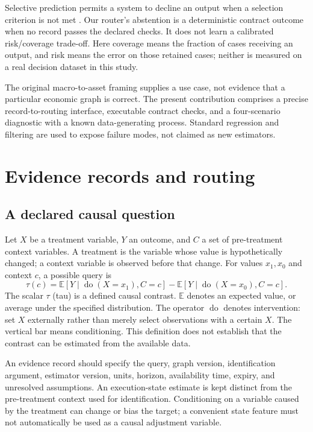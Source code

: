 Selective prediction permits a system to decline an output when a selection criterion is not met \citep{geifman2019selectivenet}. Our router's abstention is a deterministic contract outcome when no record passes the declared checks. It does not learn a calibrated risk/coverage trade-off. Here coverage means the fraction of cases receiving an output, and risk means the error on those retained cases; neither is measured on a real decision dataset in this study.

The original macro-to-asset framing supplies a use case, not evidence that a particular economic graph is correct. The present contribution comprises a precise record-to-routing interface, executable contract checks, and a four-scenario diagnostic with a known data-generating process. Standard regression and filtering are used to expose failure modes, not claimed as new estimators.

\section{Evidence records and routing}
\subsection{A declared causal question}
Let $X$ be a treatment variable, $Y$ an outcome, and $C$ a set of pre-treatment context variables. A treatment is the variable whose value is hypothetically changed; a context variable is observed before that change. For values $x_1,x_0$ and context $c$, a possible query is
\begin{equation}
 \tau(c)=\mathbb{E}[Y\mid\operatorname{do}(X=x_1),C=c]
 -\mathbb{E}[Y\mid\operatorname{do}(X=x_0),C=c].
\end{equation}
The scalar $\tau$ (tau) is a defined causal contrast. $\mathbb{E}$ denotes an expected value, or average under the specified distribution. The operator $\operatorname{do}$ denotes intervention: set $X$ externally rather than merely select observations with a certain $X$. The vertical bar means conditioning. This definition does not establish that the contrast can be estimated from the available data.

An evidence record should specify the query, graph version, identification argument, estimator version, units, horizon, availability time, expiry, and unresolved assumptions. An execution-state estimate is kept distinct from the pre-treatment context used for identification. Conditioning on a variable caused by the treatment can change or bias the target; a convenient state feature must not automatically be used as a causal adjustment variable.

